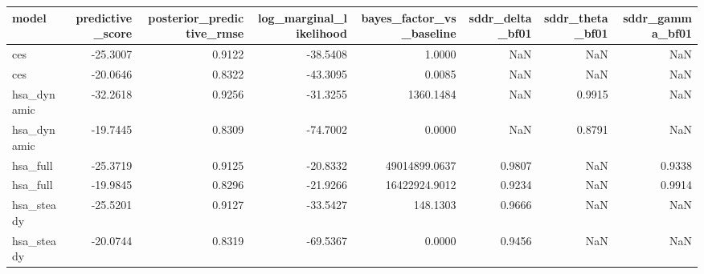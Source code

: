 \begin{tabular}{lrrrrrrr}
\toprule
model & predictive\_score & posterior\_predictive\_rmse & log\_marginal\_likelihood & bayes\_factor\_vs\_baseline & sddr\_delta\_bf01 & sddr\_theta\_bf01 & sddr\_gamma\_bf01 \\
\midrule
ces & -25.3007 & 0.9122 & -38.5408 & 1.0000 & NaN & NaN & NaN \\
ces & -20.0646 & 0.8322 & -43.3095 & 0.0085 & NaN & NaN & NaN \\
hsa\_dynamic & -32.2618 & 0.9256 & -31.3255 & 1360.1484 & NaN & 0.9915 & NaN \\
hsa\_dynamic & -19.7445 & 0.8309 & -74.7002 & 0.0000 & NaN & 0.8791 & NaN \\
hsa\_full & -25.3719 & 0.9125 & -20.8332 & 49014899.0637 & 0.9807 & NaN & 0.9338 \\
hsa\_full & -19.9845 & 0.8296 & -21.9266 & 16422924.9012 & 0.9234 & NaN & 0.9914 \\
hsa\_steady & -25.5201 & 0.9127 & -33.5427 & 148.1303 & 0.9666 & NaN & NaN \\
hsa\_steady & -20.0744 & 0.8319 & -69.5367 & 0.0000 & 0.9456 & NaN & NaN \\
\bottomrule
\end{tabular}
